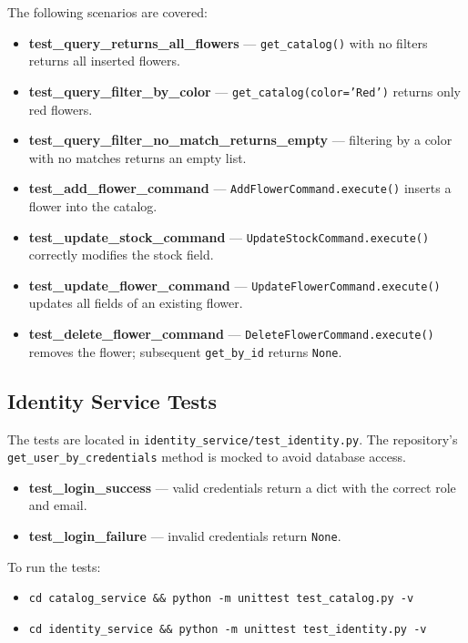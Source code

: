 \par The following scenarios are covered:

\begin{itemize}
    \item \textbf{test\_query\_returns\_all\_flowers} — \texttt{get\_catalog()} with no filters returns all inserted flowers.
    \item \textbf{test\_query\_filter\_by\_color} — \texttt{get\_catalog(color='Red')} returns only red flowers.
    \item \textbf{test\_query\_filter\_no\_match\_returns\_empty} — filtering by a color with no matches returns an empty list.
    \item \textbf{test\_add\_flower\_command} — \texttt{AddFlowerCommand.execute()} inserts a flower into the catalog.
    \item \textbf{test\_update\_stock\_command} — \texttt{UpdateStockCommand.execute()} correctly modifies the stock field.
    \item \textbf{test\_update\_flower\_command} — \texttt{UpdateFlowerCommand.execute()} updates all fields of an existing flower.
    \item \textbf{test\_delete\_flower\_command} — \texttt{DeleteFlowerCommand.execute()} removes the flower; subsequent \texttt{get\_by\_id} returns \texttt{None}.
\end{itemize}

\subsection{Identity Service Tests}

\par The tests are located in \texttt{identity\_service/test\_identity.py}. The repository's \texttt{get\_user\_by\_credentials} method is mocked to avoid database access.

\begin{itemize}
    \item \textbf{test\_login\_success} — valid credentials return a dict with the correct role and email.
    \item \textbf{test\_login\_failure} — invalid credentials return \texttt{None}.
\end{itemize}

\par To run the tests:
\begin{itemize}
    \item \texttt{cd catalog\_service \&\& python -m unittest test\_catalog.py -v}
    \item \texttt{cd identity\_service \&\& python -m unittest test\_identity.py -v}
\end{itemize}

